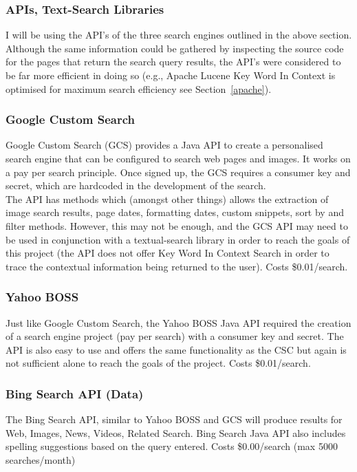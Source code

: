 \documentclass[10pt]{article}
\begin{document}
\subsubsection{APIs, Text-Search Libraries}
I will be using the API’s of the three search engines outlined in the above section. Although the same information could be gathered by inspecting the source code for the pages that return the search query results, the API’s were considered to be far more efficient in doing so (e.g., Apache Lucene Key Word In Context is optimised for maximum search efficiency see Section~\ref{apache}). 

\subsubsection{Google Custom Search}
Google Custom Search (GCS) provides a Java API to create a personalised search engine that can be configured to search web pages and images. It works on a pay per search principle. Once signed up, the GCS requires a consumer key and secret, which are hardcoded in the development of the search.\\
The API has methods which (amongst other things) allows the extraction of image search results, page dates, formatting dates, custom snippets, sort by and filter methods. However, this may not be enough, and the GCS API may need to be used in conjunction with a textual-search library in order to reach the goals of this project (the API does not offer Key Word In Context Search in order to trace the contextual information being returned to the user). Costs \$0.01/search.

\subsubsection{Yahoo BOSS}
Just like Google Custom Search, the Yahoo BOSS Java API required the creation of a search engine project (pay per search) with a consumer key and secret. The API is also easy to use and offers the same functionality as the CSC but again is not sufficient alone to reach the goals of the project. Costs \$0.01/search.

\subsubsection{Bing Search API (Data)}
The Bing Search API, similar to Yahoo BOSS and GCS will produce results for Web, Images, News, Videos, Related Search. Bing Search Java API also includes spelling suggestions based on the query entered. Costs \$0.00/search (max 5000 searches/month)
\end{document}
